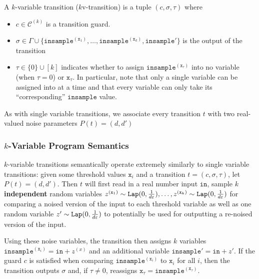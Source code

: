 
\begin{defn}
    A $k$-variable transition ($k$v-transition) is a tuple $(c, \sigma, \tau)$ where \begin{itemize}
        \item $c\in\mathcal{C}^{(k)}$ is a transition guard.
        \item $\sigma\in\Gamma\cup\{\texttt{insample}^{(\texttt{x}_1)}, \ldots, \texttt{insample}^{(\texttt{x}_k)}, \texttt{insample}'\}$ is the output of the transition
        \item $\tau \in \{0\} \cup [k]$ indicates whether to assign $\texttt{insample}^{(\texttt{x}_\tau)}$ into no variable (when $\tau = 0$) or $\texttt{x}_\tau$. In particular, note that only a single variable can be assigned into at a time and that every variable can only take its ``corresponding'' $\texttt{insample}$ value. 
    \end{itemize}
\end{defn}

As with single variable transitions, we associate every transition $t$ with two real-valued noise parameters $P(t) = (d, d')$

\subsubsection{$k$-Variable Program Semantics}

$k$-variable transitions semantically operate extremely similarly to single variable transitions: given some threshold values $\texttt{x}_i$ and a transition $t = (c, \sigma, \tau)$, let $P(t) = (d, d')$. Then $t$ will first read in a real number input $\texttt{in}$, 
sample $k$ \textbf{independent} random variables $z^{(\texttt{x}_1)}\sim\texttt{Lap}(0, \frac{1}{d\varepsilon}),\ldots, z^{(\texttt{x}_k)}\sim\texttt{Lap}(0, \frac{1}{d\varepsilon})$ for comparing a noised version of the input to each threshold variable as well as one random variable $z' \sim\texttt{Lap}(0, \frac{1}{d\varepsilon})$ to potentially be used for outputting a re-noised version of the input. 

Using these noise variables, the transition then assigns $k$ variables $\texttt{insample}^{(\texttt{x}_i)} = \texttt{in} + z^{(x)}$ and an additional variable $\texttt{insample}' = \texttt{in} + z'$. 
If the guard $c$ is satisfied when comparing $\texttt{insample}^{(\texttt{x}_i)}$ to $\texttt{x}_i$ for all $i$, then the transition outputs $\sigma$ and, if $\tau\neq 0$, reassigns $\texttt{x}_{\tau} = \texttt{insample}^{(\texttt{x}_\tau)}$.

